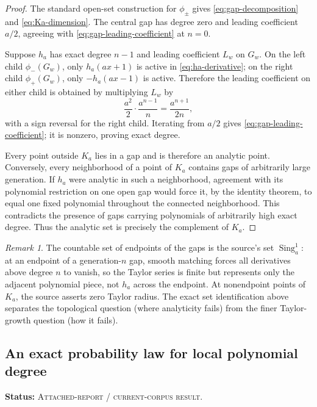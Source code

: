 \documentclass[11pt,oneside]{article}
\theoremstyle{definition}
\theoremstyle{remark}
\newtheorem{remark}[theorem]{Remark}
\newcommand{\Sing}{\operatorname{Sing}}
\newcommand{\DraftStatus}{\textcolor{DraftAmber}{\textsc{Attached-report / current-corpus result}}}
\newcommand{\status}[1]{\par\smallskip\noindent\textbf{Status:} #1.\par\smallskip}
\begin{document}
\begin{proof}
The standard open-set construction for \(\phi_\pm\) gives \eqref{eq:gap-decomposition} and \eqref{eq:Ka-dimension}.  The central gap has degree zero and leading coefficient \(a/2\), agreeing with \eqref{eq:gap-leading-coefficient} at \(n=0\).

Suppose \(h_a\) has exact degree \(n-1\) and leading coefficient \(L_w\) on \(G_w\).  On the left child \(\phi_-(G_w)\), only \(h_a(ax+1)\) is active in \eqref{eq:ha-derivative}; on the right child \(\phi_+(G_w)\), only \(-h_a(ax-1)\) is active.  Therefore the leading coefficient on either child is obtained by multiplying \(L_w\) by
\begin{equation}
  \frac{a^2}{2}\cdot\frac{a^{n-1}}{n}
  =\frac{a^{n+1}}{2n},
  \label{eq:leading-recursion}
\end{equation}
with a sign reversal for the right child.  Iterating from \(a/2\) gives \eqref{eq:gap-leading-coefficient}; it is nonzero, proving exact degree.

Every point outside \(K_a\) lies in a gap and is therefore an analytic point.  Conversely, every neighborhood of a point of \(K_a\) contains gaps of arbitrarily large generation.  If \(h_a\) were analytic in such a neighborhood, agreement with its polynomial restriction on one open gap would force it, by the identity theorem, to equal one fixed polynomial throughout the connected neighborhood.  This contradicts the presence of gaps carrying polynomials of arbitrarily high exact degree.  Thus the analytic set is precisely the complement of \(K_a\).
\end{proof}

\begin{remark}
The countable set of endpoints of the gaps is the source's set \(\Sing_a^1\): at an endpoint of a generation-\(n\) gap, smooth matching forces all derivatives above degree \(n\) to vanish, so the Taylor series is finite but represents only the adjacent polynomial piece, not \(h_a\) across the endpoint.  At nonendpoint points of \(K_a\), the source asserts zero Taylor radius.  The exact set identification above separates the topological question (where analyticity fails) from the finer Taylor-growth question (how it fails).
\end{remark}

\subsection{An exact probability law for local polynomial degree}
\status{\DraftStatus}
\end{document}
